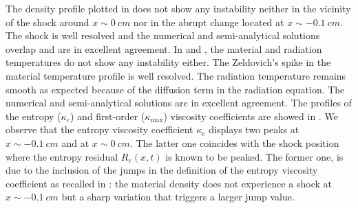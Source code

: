 \documentclass[times,doublespace]{fldauth}%
\begin{document}
%
The density profile plotted in  does not show any instability neither in the vicinity of the shock around $x \sim 0 \ cm$ nor in the abrupt change located at $x \sim -0.1 \ cm$. The shock is well resolved and the numerical and semi-analytical solutions overlap and are in excellent agreement.
In  and , the material and radiation temperatures do not show any instability either. The Zeldovich's spike in the material temperature profile is well resolved. The radiation temperature remains smooth as expected because of the diffusion term in the radiation equation. The numerical and semi-analytical solutions are in excellent agreement. 
The profiles of the entropy ($\kappa_e$) and first-order ($\kappa_\text{max}$) viscosity coefficients are showed in . We observe that the entropy viscosity coefficient $\kappa_e$ displays two peaks at $x\sim-0.1 \ cm$ and at $x \sim 0 \ cm$. The latter one coincides with the shock position where the entropy residual $R_e(x,t)$ is known to be peaked. %
The former one, is due to the inclusion of the jumps in the definition of the entropy viscosity coefficient as recalled in : the material density does not experience a shock at $x\sim-0.1 \ cm$ but a sharp variation that triggers a larger jump value. 
\end{document}
